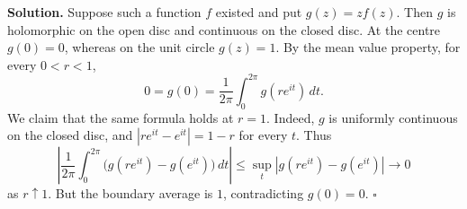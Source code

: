 \documentclass[12pt,reqno]{amsart}
\newenvironment{solution}
  {\par\smallskip\begin{tcolorbox}[breakable,enhanced,colback=solblue,colframe=solframe,
   boxrule=0.5pt,arc=2pt,left=6pt,right=6pt,top=4pt,bottom=4pt]\setlength{\abovedisplayskip}{7pt}\setlength{\belowdisplayskip}{7pt}\noindent\textbf{Solution.}}
  {\hfill$\square$\end{tcolorbox}\par\medskip}
\begin{document}
\begin{enumerate}
\begin{solution}
Suppose such a function $f$ existed and put $g(z)=zf(z)$. Then $g$
is holomorphic on the open disc and continuous on the closed disc.
At the centre $g(0)=0$, whereas on the unit circle $g(z)=1$.
By the mean value property, for every $0<r<1$,
\[
 0=g(0)=\frac{1}{2\pi}\int_0^{2\pi}g(re^{it})\,dt.
\]
We claim that the same formula holds at $r=1$. Indeed, $g$ is
uniformly continuous on the closed disc, and $|re^{it}-e^{it}|=1-r$
for every $t$. Thus
\[
\left|\frac{1}{2\pi}\int_0^{2\pi}
   \bigl(g(re^{it})-g(e^{it})\bigr)\,dt\right|
\leq \sup_t |g(re^{it})-g(e^{it})| \longrightarrow 0
\]
as $r\uparrow1$. But the boundary average is $1$, contradicting $g(0)=0$.
\end{solution}

\end{enumerate}
\end{document}
